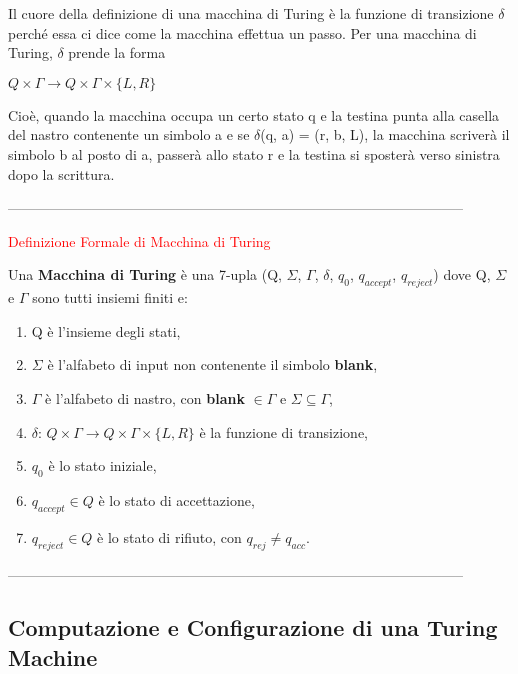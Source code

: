 \documentclass{article}
\begin{document}
Il cuore della definizione di una macchina di Turing è la funzione di transizione $\delta$ perché essa ci dice come la macchina effettua un passo.
Per una macchina di Turing, $\delta$ prende la forma

\begin{center}
    $Q \times \Gamma \rightarrow Q \times \Gamma \times \{L,R\}$
\end{center}

Cioè, quando la macchina occupa un certo stato q e la testina punta alla casella del nastro contenente un simbolo a e se $\delta$(q, a) = (r, b, L), la macchina scriverà il simbolo b al posto di a, passerà allo stato r e la testina si sposterà verso sinistra dopo la scrittura.

--------------------------------------------------------------------------------------------------

\begin{center}
   \textcolor{red}{Definizione Formale di Macchina di Turing} 
\end{center}

Una \textbf{Macchina di Turing} è una 7-upla (Q, $\Sigma$, $\Gamma$, $\delta$, $q_0$, $q_{accept}$, $q_{reject}$) dove Q, $\Sigma$ e $\Gamma$ sono tutti insiemi finiti e:

\begin{enumerate}
    \item Q è l'insieme degli stati,
    \item $\Sigma$ è l'alfabeto di input non contenente il simbolo \textbf{blank},
    \item $\Gamma$ è l'alfabeto di nastro, con \textbf{blank} $\in \Gamma$ e $\Sigma \subseteq \Gamma$,
    \item $\delta$: $Q \times \Gamma \rightarrow Q \times \Gamma \times \{L,R\}$ è la funzione di transizione,
    \item $q_0$ è lo stato iniziale,
    \item $q_{accept} \in Q$ è lo stato di accettazione,
    \item $q_{reject} \in Q$ è lo stato di rifiuto, con $q_{rej} \neq q_{acc}$.
\end{enumerate}

--------------------------------------------------------------------------------------------------

\subsection{Computazione e Configurazione di una Turing Machine}
\end{document}

